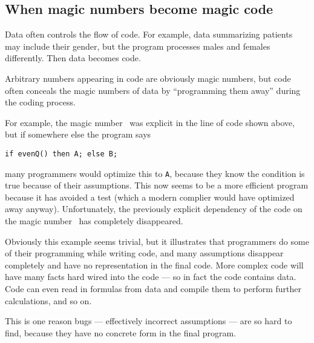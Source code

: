 \documentclass[10pt,a4paper]{article}
\begin{document}
\begin{change}
\subsection{When magic numbers become magic code}
Data often controls the flow of code. For example, data summarizing patients may include their gender, but the program processes males and females differently. Then data becomes code.

Arbitrary numbers appearing in code are obviously magic numbers, but code often conceals the magic numbers of data by ``programming them away'' during the coding process. 

For example, the magic number \the\magicNumber\ was explicit in the line of code shown above, but if somewhere else the program says

\begin{center}\texttt{if evenQ(\the\magicNumber) then A; else B;}\end{center}

many programmers would optimize this to \texttt{A}, because they know the condition is true because of their assumptions. This now seems to be a more efficient program because it has avoided a test (which a modern complier would have optimized away anyway). Unfortunately, the previously explicit dependency of the code on the magic number \the\magicNumber\ has completely disappeared.

Obviously this example seems trivial, but it illustrates that programmers do some of their programming while writing code, and many assumptions disappear completely and have no representation in the final code. More complex code will have many facts hard wired into the code --- so in fact the code contains data. Code can even read in formulas from data and compile them to perform further calculations, and so on.  

This is one reason bugs --- effectively incorrect assumptions --- are so hard to find, because they have no concrete form in the final program.


\end{change}
\end{document}
